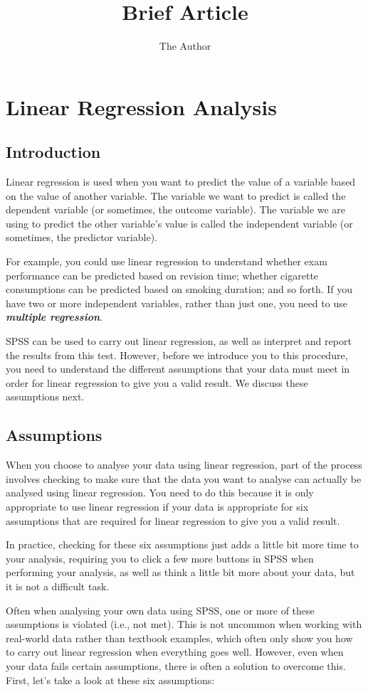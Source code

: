 \documentclass[11pt]{article} %
\title{Brief Article}
\author{The Author}
\begin{document}
\section{Linear Regression Analysis}

\subsection{Introduction}
Linear regression is used when you want to predict the value of a variable based on the value of another variable. The variable we want to predict is called the dependent variable (or sometimes, the outcome variable). The variable we are using to predict the other variable's value is called the independent variable (or sometimes, the predictor variable).


For example, you could use linear regression to understand whether exam performance can be predicted based on revision time; whether cigarette consumptions can be predicted based on smoking duration; and so forth. If you have two or more independent variables, rather than just one, you need to use \textbf{\textit{multiple regression}}.

SPSS can be used to carry out linear regression, as well as interpret and report the results from this test. However, before we introduce you to this procedure, you need to understand the different assumptions that your data must meet in order for linear regression to give you a valid result. We discuss these assumptions next.


\subsection{Assumptions}
When you choose to analyse your data using linear regression, part of the process involves checking to make sure that the data you want to analyse can actually be analysed using linear regression. You need to do this because it is only appropriate to use linear regression if your data is appropriate for six assumptions that are required for linear regression to give you a valid result.

In practice, checking for these six assumptions just adds a little bit more time to your analysis, requiring you to click a few more buttons in SPSS when performing your analysis, as well as think a little bit more about your data, but it is not a difficult task.

Often when analysing your own data using SPSS, one or more of these assumptions is violated (i.e., not met). This is not uncommon when working with real-world data rather than textbook examples, which often only show you how to carry out linear regression when everything goes well. However, even when your data fails certain assumptions, there is often a solution to overcome this. First, let’s take a look at these six assumptions:
\end{document}

